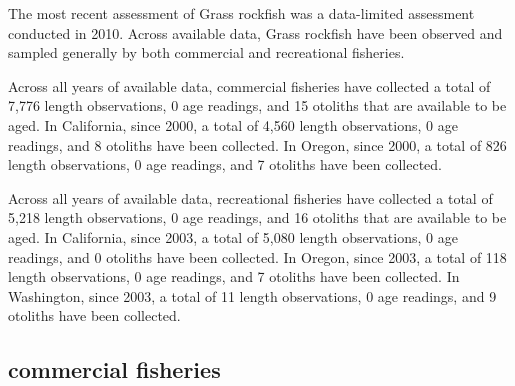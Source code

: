 \documentclass[11pt,
  english,
  letterpaper,
]{article}
\begin{document}
\leavevmode\tagmcend\tagstructend


The most recent assessment of Grass rockfish was a data-limited assessment conducted in 2010. Across available data, Grass rockfish have been observed and sampled generally by both commercial and recreational fisheries.

\leavevmode\tagmcend\tagstructend\par


Across all years of available data, commercial fisheries have collected a total of 7,776 length observations, 0 age readings, and 15 otoliths that are available to be aged. In California, since 2000, a total of 4,560 length observations, 0 age readings, and 8 otoliths have been collected. In Oregon, since 2000, a total of 826 length observations, 0 age readings, and 7 otoliths have been collected.

\leavevmode\tagmcend\tagstructend\par


Across all years of available data, recreational fisheries have collected a total of 5,218 length observations, 0 age readings, and 16 otoliths that are available to be aged. In California, since 2003, a total of 5,080 length observations, 0 age readings, and 0 otoliths have been collected. In Oregon, since 2003, a total of 118 length observations, 0 age readings, and 7 otoliths have been collected. In Washington, since 2003, a total of 11 length observations, 0 age readings, and 9 otoliths have been collected.

\leavevmode\tagmcend\tagstructend\par


\hypertarget{commercial-fisheries-23}{%
\subsection{commercial fisheries}\label{commercial-fisheries-23}}

\leavevmode\tagmcend\tagstructend


\begingroup\fontsize{10}{12}\selectfont \begingroup\fontsize{10}{12}\selectfont
\end{document}
